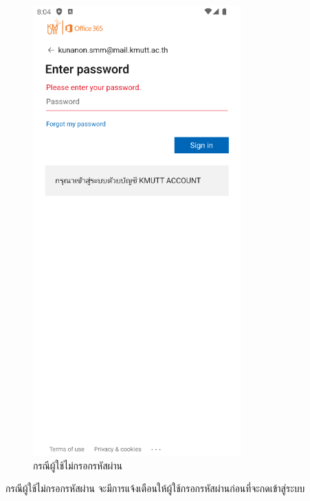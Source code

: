 \documentclass[14pt,oneside,openright,a4paper]{cpe-thai-project}
\begin{document}
\begin{figure}[!h]\centering
  \includegraphics[width=8cm]{./Pictures/Scene3.png}
  \caption{กรณีผู้ใช้ไม่กรอกรหัสผ่าน}\label{fig:NoPasswordTest}
\end{figure}
  \hspace*{1cm} กรณีผู้ใช้ไม่กรอกรหัสผ่าน จะมีการแจ้งเตือนให้ผู้ใช้กรอกรหัสผ่านก่อนที่จะกดเข้าสู่ระบบ

\newpage
\end{document}
